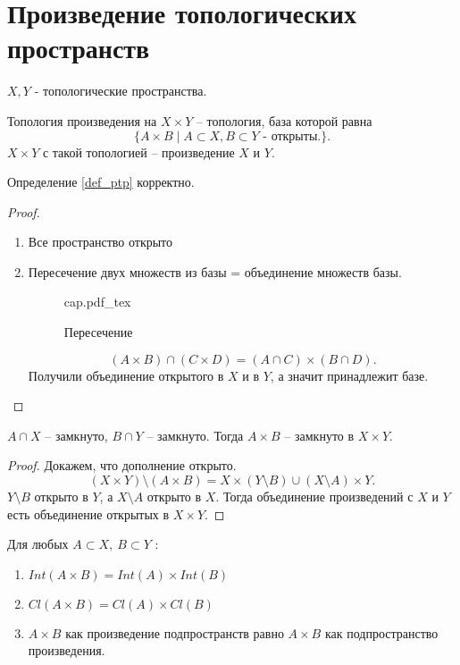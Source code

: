 \documentclass[12pt]{report}
\newcommand{\incfig}[1]{%
    \def\svgwidth{\columnwidth}
    {#1.pdf_tex}
}
\begin{document}
\section{Произведение топологических пространств}
\begin{defn}\label{def_ptp}
    $X, Y$ - топологические пространства.

    Топология произведения на $X \times Y$ -- топология, база которой равна 
    \[
    \{A \times B \mid A \subset X, B \subset Y \mbox{ - открыты.}\}
    .\] 
    $X \times Y$ с такой топологией -- произведение $X$ и $Y$.
\end{defn}
\begin{thm}
    Определение \ref{def_ptp} корректно.
\end{thm}
\begin{proof}
    \begin{enumerate}
        \item Все пространство открыто
	\item Пересечение двух множеств из базы = объединение множеств базы.
\begin{figure}[ht]
    \centering
    \incfig{cap}
    \caption{Пересечение}
    \label{fig:cap}
\end{figure}
\[
    (A \times B) \cap (C \times D) = (A \cap C) \times (B \cap D)
.\] 
Получили объединение открытого в $X$ и в $Y$, а значит принадлежит базе.
    \end{enumerate}
\end{proof}
\begin{thm}
    $A \cap X$ -- замкнуто, $B \cap Y$ -- замкнуто. Тогда $A \times B $ -- замкнуто в $X \times Y$.
\end{thm}
\begin{proof}
    Докажем, что дополнение открыто.
    \[
	(X \times Y) \setminus(A \times B) = X \times (Y \setminus B) \cup (X \setminus A) \times Y
    .\] 
$Y \setminus B$ открыто в $Y$, а $X \setminus A$ открыто в $X$. Тогда объединение произведений с $X$ и $Y$ есть объединение открытых в $X \times Y$.
\end{proof}
\begin{probl}
    Для любых $A \subset X, ~ B \subset Y$ :
    \begin{enumerate}
	\item $Int (A \times B) = Int(A) \times Int(B)$
	\item  $Cl (A \times B) = Cl(A) \times Cl(B)$
	\item  $A \times B$  как произведение подпространств равно $A \times B$ как подпространство произведения.
    \end{enumerate}
\end{probl}
\end{document}
